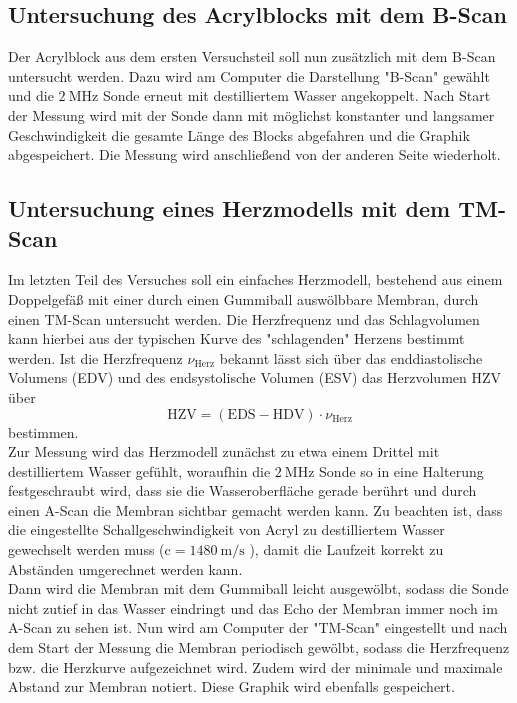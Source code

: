 \subsection{Untersuchung des Acrylblocks mit dem B-Scan}
Der Acrylblock aus dem ersten Versuchsteil soll nun zusätzlich mit dem B-Scan untersucht werden.
Dazu wird am Computer die Darstellung "B-Scan" gewählt und die $\SI{2}{\mega\hertz}$ Sonde
erneut mit destilliertem Wasser angekoppelt. Nach Start der Messung wird mit der Sonde
dann mit möglichst konstanter und langsamer Geschwindigkeit die gesamte Länge des
Blocks abgefahren und die Graphik abgespeichert. Die Messung wird anschließend von
der anderen Seite wiederholt.

\subsection{Untersuchung eines Herzmodells mit dem TM-Scan}
Im letzten Teil des Versuches soll ein einfaches Herzmodell, bestehend aus
einem Doppelgefäß mit einer durch einen Gummiball auswölbbare Membran,
durch einen TM-Scan untersucht werden. Die Herzfrequenz und das Schlagvolumen kann hierbei
aus der typischen Kurve des "schlagenden" Herzens bestimmt werden.
Ist die Herzfrequenz $\nu_{\text{Herz}}$ bekannt lässt sich über das
enddiastolische Volumens (EDV) und des endsystolische Volumen (ESV) das Herzvolumen HZV
über
\begin{equation}
  \text{HZV}= (\text{EDS} - \text{HDV})\cdot \nu_{\text{Herz}}
  \label{eqn:herzv}
\end{equation}
bestimmen. \\

Zur Messung wird das Herzmodell zunächst zu etwa einem Drittel mit destilliertem
Wasser gefühlt, woraufhin die $\SI{2}{\mega\hertz}$ Sonde so in eine Halterung
festgeschraubt wird, dass sie die Wasseroberfläche gerade berührt und durch einen
A-Scan die Membran sichtbar gemacht werden kann. Zu beachten ist, dass die eingestellte
Schallgeschwindigkeit von Acryl zu destilliertem Wasser gewechselt werden muss
($\text{c} = \SI{1480}{\meter\per\second}$ ), damit die Laufzeit korrekt zu Abständen
umgerechnet werden kann.
\\
Dann wird die Membran mit dem Gummiball leicht ausgewölbt, sodass die Sonde nicht zutief
in das Wasser eindringt und das Echo der Membran immer noch im A-Scan zu sehen ist.
Nun wird am Computer der "TM-Scan" eingestellt und nach dem Start der Messung die Membran
periodisch gewölbt, sodass die Herzfrequenz bzw. die Herzkurve aufgezeichnet wird.
Zudem wird der minimale und maximale Abstand zur Membran notiert.
Diese Graphik wird ebenfalls gespeichert.
